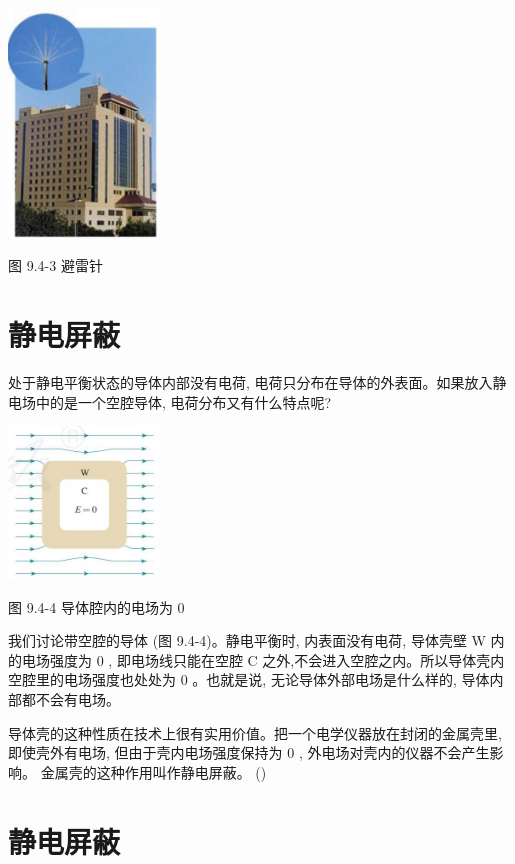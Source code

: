 \documentclass[10pt]{article}
\begin{document}
\begin{center}
\includegraphics[max width=0.3\textwidth]{images/01911d5f-8e38-70c0-b5b8-2b399bd115b6_24_943712.jpg}
\end{center}

图 9.4-3 避雷针

\section*{静电屏蔽}

处于静电平衡状态的导体内部没有电荷, 电荷只分布在导体的外表面。如果放入静电场中的是一个空腔导体, 电荷分布又有什么特点呢?

\begin{center}
\includegraphics[max width=0.3\textwidth]{images/01911d5f-8e38-70c0-b5b8-2b399bd115b6_24_192467.jpg}
\end{center}

图 9.4-4 导体腔内的电场为 0

我们讨论带空腔的导体 (图 9.4-4)。静电平衡时, 内表面没有电荷, 导体壳壁 W 内的电场强度为 0 , 即电场线只能在空腔 \(\mathrm{C}\) 之外,不会进入空腔之内。所以导体壳内空腔里的电场强度也处处为 0 。也就是说, 无论导体外部电场是什么样的, 导体内部都不会有电场。

导体壳的这种性质在技术上很有实用价值。把一个电学仪器放在封闭的金属壳里, 即使壳外有电场, 但由于壳内电场强度保持为 0 , 外电场对壳内的仪器不会产生影响。 金属壳的这种作用叫作静电屏蔽。 ()

\section*{静电屏蔽}
\end{document}
